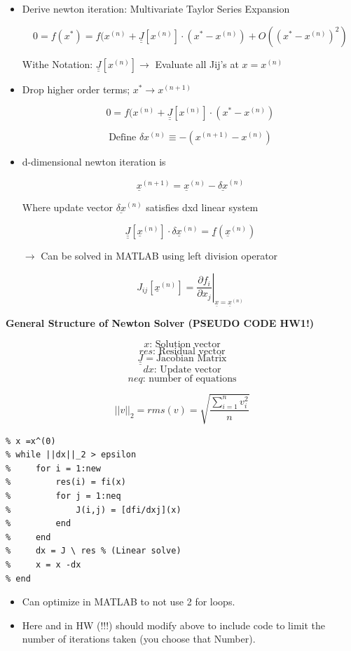\begin{itemize}
    \item Derive newton iteration: Multivariate Taylor Series Expansion

    \[ 0 = f(x^*) = f(x^{(n)} + \underline{\underline{J}} [x^{(n)}] \cdot (x^* - x^{(n)} ) + O((x^*-x^{(n)})^2)\]

    Withe Notation: $\underline{\underline{J}} [x^{(n)}] \rightarrow $ Evaluate all Jij's at $x = x^{(n)}$

    \item Drop higher order terms; $x^* \rightarrow x^{(n+1)}$

    \[ 0 = f(x^{(n)} + \underline{\underline{J}} [x^{(n)}] \cdot (x^* - x^{(n)} )\]

    \[ \text{Define } \delta x^{(n)} \equiv - ( x^{(n+1)} - x^{(n)})\]

    \item d-dimensional newton iteration is

    \begin{equation}
        \underline{x}^{(n+1)} = \underline{x}^{(n)} - \underline{\delta x}^{(n)}
    \end{equation}

    Where update vector $\underline{\delta x}^{(n)}$ satisfies dxd linear system

    \begin{equation}
        \underline{\underline{J}}[\underline{x}^{(n)}] \cdot \delta \underline{x}^{(n)} = \underline{f}(\underline{x}^{(n)})
    \end{equation}

    $\rightarrow$ Can be solved in MATLAB using left division operator
    
    \begin{equation}
        J_{ij}[\underline{x}^{(n)}] = \left. \frac{\partial f_i}{\partial x_j} \right|_{\underline{x}=\underline{x}^{(n)}}
    \end{equation}
\end{itemize}

\textbf{General Structure of Newton Solver (PSEUDO CODE HW1!)}

\[x \text{: Solution vector}\]
\[res \text{: Residual vector}\]
\[\underline{\underline{J}} = \text{Jacobian Matrix} \]
\[ dx \text{: Update vector}\]
\[ neq \text{: number of equations}\]

\[ ||v||_2 = rms(v) = \sqrt{\frac{\sum_{i=1}^n v_i^2}{n}} \]


\begin{verbatim}
% x =x^(0)
% while ||dx||_2 > epsilon
%     for i = 1:new
%         res(i) = fi(x)
%         for j = 1:neq
%             J(i,j) = [dfi/dxj](x)
%         end
%     end
%     dx = J \ res % (Linear solve)
%     x = x -dx
% end
\end{verbatim}


\begin{itemize}
    \item Can optimize in MATLAB to not use 2 for loops.

    \item Here and in HW (!!!) should modify above to include code to limit the number of iterations taken (you choose that Number).
    
\end{itemize}

